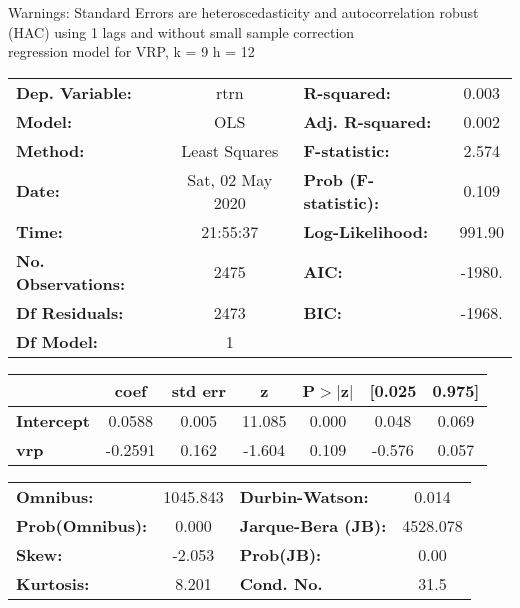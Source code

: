 Warnings: \newline
 [1] Standard Errors are heteroscedasticity and autocorrelation robust (HAC) using 1 lags and without small sample correction\\ 

regression model for VRP, k = 9 h = 12\begin{center}
\begin{tabular}{lclc}
\toprule
\textbf{Dep. Variable:}    &       rtrn       & \textbf{  R-squared:         } &     0.003   \\
\textbf{Model:}            &       OLS        & \textbf{  Adj. R-squared:    } &     0.002   \\
\textbf{Method:}           &  Least Squares   & \textbf{  F-statistic:       } &     2.574   \\
\textbf{Date:}             & Sat, 02 May 2020 & \textbf{  Prob (F-statistic):} &    0.109    \\
\textbf{Time:}             &     21:55:37     & \textbf{  Log-Likelihood:    } &    991.90   \\
\textbf{No. Observations:} &        2475      & \textbf{  AIC:               } &    -1980.   \\
\textbf{Df Residuals:}     &        2473      & \textbf{  BIC:               } &    -1968.   \\
\textbf{Df Model:}         &           1      & \textbf{                     } &             \\
\bottomrule
\end{tabular}
\begin{tabular}{lcccccc}
                   & \textbf{coef} & \textbf{std err} & \textbf{z} & \textbf{P$> |$z$|$} & \textbf{[0.025} & \textbf{0.975]}  \\
\midrule
\textbf{Intercept} &       0.0588  &        0.005     &    11.085  &         0.000        &        0.048    &        0.069     \\
\textbf{vrp}       &      -0.2591  &        0.162     &    -1.604  &         0.109        &       -0.576    &        0.057     \\
\bottomrule
\end{tabular}
\begin{tabular}{lclc}
\textbf{Omnibus:}       & 1045.843 & \textbf{  Durbin-Watson:     } &    0.014  \\
\textbf{Prob(Omnibus):} &   0.000  & \textbf{  Jarque-Bera (JB):  } & 4528.078  \\
\textbf{Skew:}          &  -2.053  & \textbf{  Prob(JB):          } &     0.00  \\
\textbf{Kurtosis:}      &   8.201  & \textbf{  Cond. No.          } &     31.5  \\
\bottomrule
\end{tabular}
\end{center}

